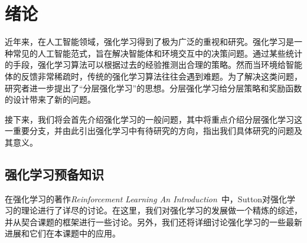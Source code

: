 \chapter{绪论}
近年来，在人工智能领域，强化学习得到了极为广泛的重视和研究。强化学习是一种常见的人工智能范式，旨在解决智能体和环境交互中的决策问题。通过某些统计的手段，强化学习算法可以根据过去的经验推测出合理的策略。然而当环境给智能体的反馈非常稀疏时，传统的强化学习算法往往会遇到难题。为了解决这类问题，研究者进一步提出了``分层强化学习''的思想。分层强化学习给分层策略和奖励函数的设计带来了新的问题。

接下来，我们将会首先介绍强化学习的一般问题，其中将重点介绍分层强化学习这一重要分支，并由此引出强化学习中有待研究的方向，指出我们具体研究的问题及其意义。

\section{强化学习预备知识}
  在强化学习的著作\textit{Reinforcement Learning An Introduction}~\cite{Sutton_book}中，Sutton对强化学习的理论进行了详尽的讨论。在这里，我们对强化学习的发展做一个精炼的综述，并从契合课题的框架进行一些讨论。另外，我们还将详细讨论强化学习的一些最新进展和它们在本课题中的应用。
